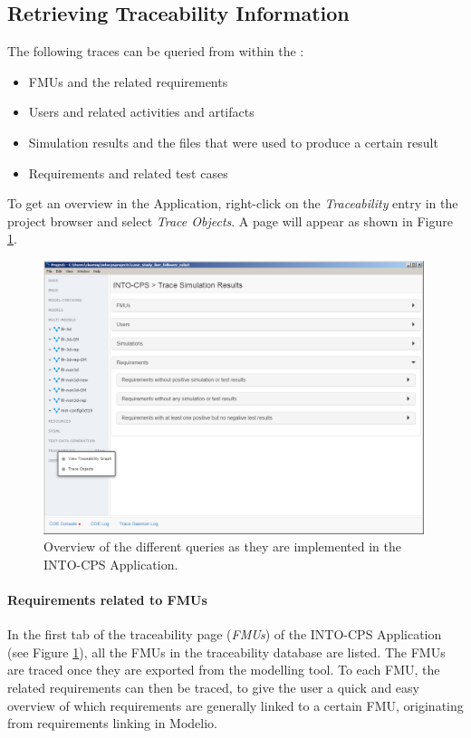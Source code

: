 \subsection{Retrieving Traceability Information}
The following traces can be queried from within the \intoapp:
%
\begin{itemize}
\item FMUs and the related requirements
\item Users and related activities and artifacts
\item Simulation results and the files that were used to produce a certain result
\item Requirements and related test cases
\end{itemize}
%
To get an overview in the Application, right-click on the \emph{Traceability} entry in the project browser and select \emph{Trace Objects}. A page will appear as shown in Figure \ref{fig:trace_overview}.
%
\begin{figure}[htbp]
\centering
\includegraphics[width=0.99\textwidth]{figures/trace_overview}
\caption{Overview of the different queries as they are implemented in the INTO-CPS Application.}
\label{fig:trace_overview}
\end{figure}
%
\paragraph{Requirements related to FMUs}
In the first tab of the traceability page (\emph{FMUs}) of the INTO-CPS Application (see Figure \ref{fig:trace_overview}), all the FMUs in the traceability database are listed. The FMUs are traced once they are exported from the modelling tool. To each FMU, the related requirements can then be traced, to give the user a quick and easy overview of which requirements are generally linked to a certain FMU, originating from requirements linking in Modelio. 
%
